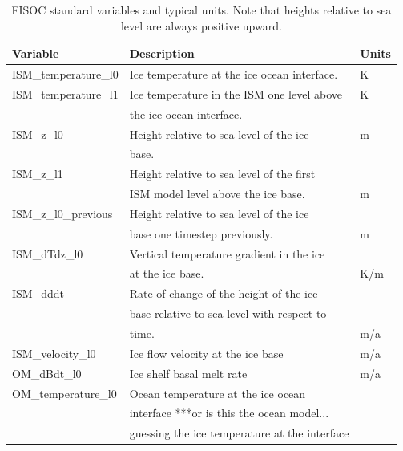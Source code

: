 \documentclass[12pt]{article}
\begin{document}
\begin{table}
  \begin{center}
    \begin{tabular}{ l|l|l }
      Variable              & Description                                  & Units \\
      \hline
      ISM\_temperature\_l0  & Ice temperature at the ice ocean interface.  & K \\
      ISM\_temperature\_l1  & Ice temperature in the ISM one level above   & K \\
                            & the ice ocean interface.                     &   \\ 
      ISM\_z\_l0            & Height relative to sea level of the ice      & m \\
                            & base.                                        &   \\
      ISM\_z\_l1            & Height relative to sea level of the first    &   \\
                            & ISM model level above the ice base.          & m \\
      ISM\_z\_l0\_previous  & Height relative to sea level of the ice      &   \\
                            & base one timestep previously.                & m \\
      ISM\_dTdz\_l0         & Vertical temperature gradient in the ice     &   \\
                            & at the ice base.                             & K/m \\
      ISM\_dddt             & Rate of change of the height of the ice      &   \\
                            & base relative to sea level with respect to   &   \\
                            & time.                                        & m/a \\
      ISM\_velocity\_l0     & Ice flow velocity at the ice base            & m/a \\
      OM\_dBdt\_l0          & Ice shelf basal melt rate                    & m/a \\
      OM\_temperature\_l0   & Ocean temperature at the ice ocean           &   \\
                            & interface  ***or is this the ocean model...  &   \\
                            & guessing the ice temperature at the interface&   \\
    \end{tabular}
  \end{center}
  \caption{FISOC standard variables and typical units.  
    Note that heights relative to sea level are always positive upward.}
  \label{tab:vars}
\end{table}
\end{document}
